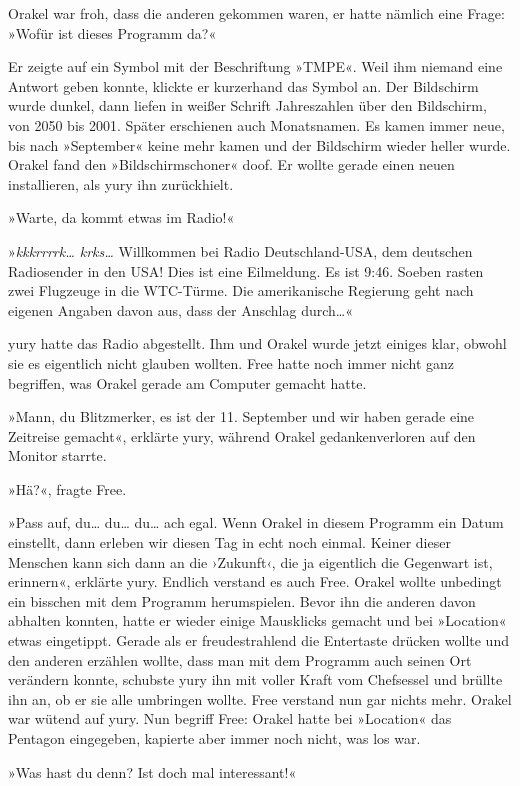 Orakel war froh, dass die anderen gekommen waren, er hatte nämlich eine Frage: »Wofür ist dieses Programm da?«

Er zeigte auf ein Symbol mit der Beschriftung »TMPE«. Weil ihm niemand eine Antwort geben konnte, klickte er kurzerhand das Symbol an. Der Bildschirm wurde dunkel, dann liefen in weißer Schrift Jahreszahlen über den Bildschirm, von 2050 bis 2001. Später erschienen auch Monatsnamen. Es kamen immer neue, bis nach »September« keine mehr kamen und der Bildschirm wieder heller wurde. Orakel fand den »Bildschirmschoner« doof. Er wollte gerade einen neuen installieren, als yury ihn zurückhielt.

»Warte, da kommt etwas im Radio!«

»\textit{kkkrrrrk… krks…} Willkommen bei Radio Deutschland-USA, dem deutschen Radiosender in den USA! Dies ist eine Eilmeldung. Es ist 9:46. Soeben rasten zwei Flugzeuge in die WTC-Türme. Die amerikanische Regierung geht nach eigenen Angaben davon aus, dass der Anschlag durch…«

yury hatte das Radio abgestellt. Ihm und Orakel wurde jetzt einiges klar, obwohl sie es eigentlich nicht glauben wollten. Free hatte noch immer nicht ganz begriffen, was Orakel gerade am Computer gemacht hatte.

»Mann, du Blitzmerker, es ist der 11. September und wir haben gerade eine Zeitreise gemacht«, erklärte yury, während Orakel gedankenverloren auf den Monitor starrte.

»Hä?«, fragte Free.

»Pass auf, du… du… du… ach egal. Wenn Orakel in diesem Programm ein Datum einstellt, dann erleben wir diesen Tag in echt noch einmal. Keiner dieser Menschen kann sich dann an die ›Zukunft‹, die ja eigentlich die Gegenwart ist, erinnern«, erklärte yury. Endlich verstand es auch Free. Orakel wollte unbedingt ein bisschen mit dem Programm herumspielen. Bevor ihn die anderen davon abhalten konnten, hatte er wieder einige Mausklicks gemacht und bei »Location« etwas eingetippt. Gerade als er freudestrahlend die Entertaste drücken wollte und den anderen erzählen wollte, dass man mit dem Programm auch seinen Ort verändern konnte, schubste yury ihn mit voller Kraft vom Chefsessel und brüllte ihn an, ob er sie alle umbringen wollte. Free verstand nun gar nichts mehr. Orakel war wütend auf yury. Nun begriff Free: Orakel hatte bei »Location« das Pentagon eingegeben, kapierte aber immer noch nicht, was los war.

»Was hast du denn? Ist doch mal interessant!«

